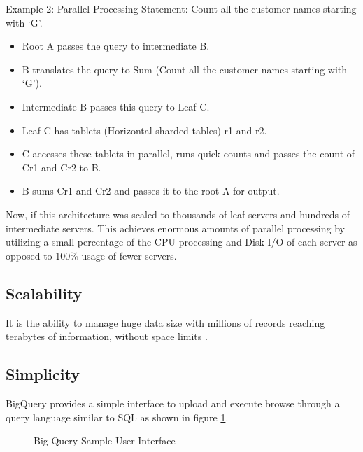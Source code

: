 \documentclass[9pt,twocolumn,twoside]{../../styles/osajnl}
\begin{document}
\noindent
Example 2: Parallel Processing \newline
Statement: Count all the customer names
starting with ‘G’. \newline

\begin{itemize}[noitemsep,topsep=0pt]
\item Root A passes the query to intermediate B. \item B translates
  the query to Sum (Count all the customer names starting with
  ‘G’). \item Intermediate B passes this query to Leaf C. \item Leaf C
  has tablets (Horizontal sharded tables) r1 and r2. \item C accesses
  these tablets in parallel, runs quick counts and passes the count of
  Cr1 and Cr2 to B. \item B sums Cr1 and Cr2 and passes it to the root
  A for output. \end{itemize}

\noindent
Now, if this architecture was scaled to thousands of leaf servers and
hundreds of intermediate servers. This achieves enormous amounts of
parallel processing by utilizing a small percentage of the CPU
processing and Disk I/O of each server as opposed to 100\% usage of
fewer servers.

\subsection{Scalability}
It is the ability to manage huge data size with millions of records
reaching terabytes of information, without space limits .

\subsection{Simplicity}
BigQuery provides a simple interface to upload and execute browse
through a query language similar to SQL as shown in figure \ref{fig:bigqueryinterface}.

\begin{figure}[htbp]
\centering
{}
\caption{\cite{www-userinterface-bigquery} Big Query Sample User Interface}
\label{fig:bigqueryinterface}
\end{figure}
\end{document}
